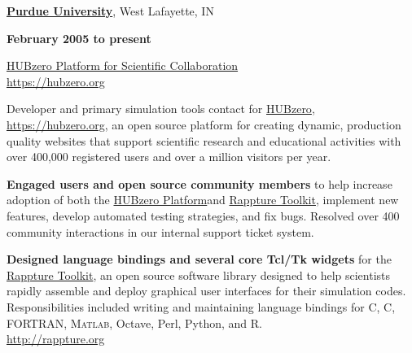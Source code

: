 \documentclass[10pt]{article}
\renewcommand\textit[1]{\underline{\smash{#1}}}
\newcommand{\halfblankline}{\quad\vspace{-0.5\baselineskip}\pagebreak[3]}
\providecommand\Matlab{\textsc{Matlab}}
\newcommand\CC{C\nolinebreak[4]\hspace{-.05em}\raisebox{.4ex}{\relsize{-3}{\textbf{++}}}}
\newcommand\HUBZEROPLATFORM{\href{https://hubzero.org}{HUBzero Platform}}
\newcommand\HUBZEROREGISTERED{\href{https://hubzero.org}{HUBzero\textsuperscript{\textregistered}}}
\newcommand\HUBZEROPLATFORMSCICOL{\href{https://hubzero.org}{HUBzero Platform for Scientific Collaboration}}
\newcommand\RAPPTURE{\href{http://rappture.org}{Rappture Toolkit}}
\begin{document}
\href{http://www.purdue.edu/}{\textbf{Purdue University}},
West Lafayette, IN
\begin{outerlist}

    \item[] \textit{Software Engineer}%
            \hfill \textbf{February 2005 to present}
    \item[] \HUBZEROPLATFORMSCICOL \\
        \url{https://hubzero.org}

        Developer and primary simulation tools contact for \HUBZEROREGISTERED,
        \url{https://hubzero.org}, an open source platform for creating
        dynamic, production quality websites that support scientific research
        and educational activities with over 400,000 registered users and over
        a million visitors per year.

        \halfblankline

        \begin{innerlist}

            \item \textbf{Engaged users and open source community members} to help
                increase adoption of both the \HUBZEROPLATFORM \space and \RAPPTURE,
                implement new features, develop automated testing
                strategies, and fix bugs. Resolved over 400 community
                interactions in our internal support ticket system.

            \halfblankline

             \item \textbf{Designed language bindings and several core Tcl/Tk widgets}
                for the \RAPPTURE, an open source software library designed to help
                scientists rapidly assemble and deploy graphical user interfaces for
                their simulation codes. Responsibilities included writing and maintaining
                language bindings for C, \CC, FORTRAN, \Matlab, Octave, Perl, Python,
                and R. \\
                \url{http://rappture.org}


            \halfblankline


\end{innerlist}
\end{outerlist}
\end{document}
